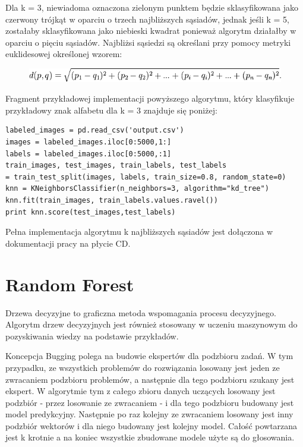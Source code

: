 \documentclass[brudnopis]{xmgr}
\begin{document}
Dla k = 3, niewiadoma oznaczona zielonym punktem będzie sklasyfikowana jako czerwony trójkąt w oparciu o trzech najbliższych sąsiadów, jednak jeśli k = 5, zostałaby sklasyfikowana jako niebieski kwadrat ponieważ algorytm działałby w oparciu o pięciu sąsiadów. Najbliżsi sąsiedzi są określani przy pomocy metryki euklidesowej określonej wzorem:

\begin{figure}[!tbh]
\centering
\includegraphics[width=1\hsize]{fig/knn-wzor}
\end{figure}

Fragment przykładowej implementacji powyższego algorytmu, który klasyfikuje przykładowy znak alfabetu dla k = 3 znajduje się poniżej:
\newpage

\begin{verbatim}
labeled_images = pd.read_csv('output.csv')
images = labeled_images.iloc[0:5000,1:]
labels = labeled_images.iloc[0:5000,:1]
train_images, test_images, train_labels, test_labels 
= train_test_split(images, labels, train_size=0.8, random_state=0)
knn = KNeighborsClassifier(n_neighbors=3, algorithm="kd_tree")
knn.fit(train_images, train_labels.values.ravel())
print knn.score(test_images,test_labels)
\end{verbatim}

Pełna implementacja algorytmu k najbliższych sąsiadów jest dołączona w dokumentacji pracy na płycie CD.

\section{Random Forest}
Drzewa decyzyjne to graficzna metoda wspomagania procesu decyzyjnego. Algorytm drzew decyzyjnych jest również stosowany w uczeniu maszynowym do pozyskiwania wiedzy na podstawie przykładów.

Koncepcja Bugging polega na budowie ekspertów dla podzbioru zadań. W tym przypadku, ze wszystkich problemów do rozwiązania losowany jest jeden ze zwracaniem podzbioru problemów, a następnie dla tego podzbioru szukany jest ekspert. W algorytmie tym z całego zbioru danych uczących losowany jest podzbiór - przez losowanie ze zwracaniem - i dla tego podzbioru budowany jest model predykcyjny. Następnie po raz kolejny ze zwracaniem losowany jest inny podzbiór wektorów i dla niego budowany jest kolejny model. Całość powtarzana jest k krotnie a na koniec wszystkie zbudowane modele użyte są do głosowania.
\end{document}
